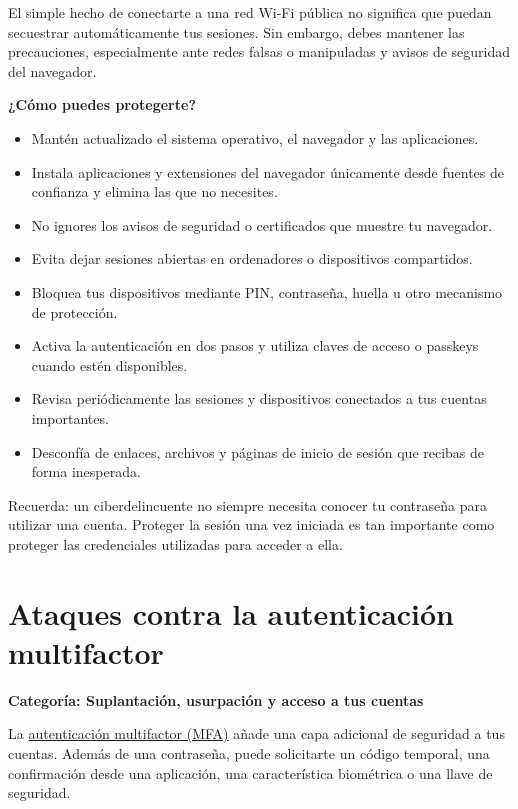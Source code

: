 \documentclass[
  spanish,
  a4paper,
  openany]{book}
\begin{document}
El simple hecho de conectarte a una red Wi-Fi pública no significa que puedan secuestrar automáticamente tus sesiones. Sin embargo, debes mantener las precauciones, especialmente ante redes falsas o manipuladas y avisos de seguridad del navegador.

\textbf{¿Cómo puedes protegerte?}

\begin{itemize}
\item
  Mantén actualizado el sistema operativo, el navegador y las aplicaciones.
\item
  Instala aplicaciones y extensiones del navegador únicamente desde fuentes de confianza y elimina las que no necesites.
\item
  No ignores los avisos de seguridad o certificados que muestre tu navegador.
\item
  Evita dejar sesiones abiertas en ordenadores o dispositivos compartidos.
\item
  Bloquea tus dispositivos mediante PIN, contraseña, huella u otro mecanismo de protección.
\item
  Activa la autenticación en dos pasos y utiliza claves de acceso o passkeys cuando estén disponibles.
\item
  Revisa periódicamente las sesiones y dispositivos conectados a tus cuentas importantes.
\item
  Desconfía de enlaces, archivos y páginas de inicio de sesión que recibas de forma inesperada.
\end{itemize}

Recuerda: un ciberdelincuente no siempre necesita conocer tu contraseña para utilizar una cuenta. Proteger la sesión una vez iniciada es tan importante como proteger las credenciales utilizadas para acceder a ella.

\section{Ataques contra la autenticación multifactor}\label{ataques-contra-la-autenticaciuxf3n-multifactor}

\textbf{Categoría: Suplantación, usurpación y acceso a tus cuentas}

La \hyperref[mfa-multi-factor-authentication-o-autenticaciuxf3n-de-factores-muxfaltiples]{autenticación multifactor (MFA)} añade una capa adicional de seguridad a tus cuentas. Además de una contraseña, puede solicitarte un código temporal, una confirmación desde una aplicación, una característica biométrica o una llave de seguridad.
\end{document}
